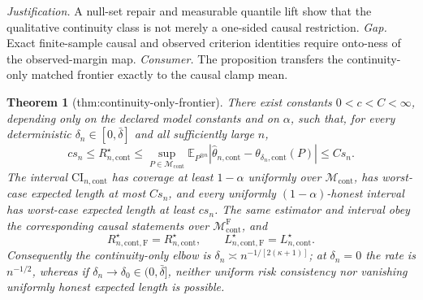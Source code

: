\documentclass{article}
\newtheorem{theorem}{Theorem}
\begin{document}
\par\smallskip\noindent \textit{Justification.} A null-set repair and measurable quantile lift show that the qualitative continuity class is not merely a one-sided causal restriction. \textit{Gap.} Exact finite-sample causal and observed criterion identities require onto-ness of the observed-margin map. \textit{Consumer.} The proposition transfers the continuity-only matched frontier exactly to the causal clamp mean.

\begin{theorem}[thm:continuity-only-frontier]\label{thm:continuity-only-frontier}
There exist constants \(0<c<C<\infty\), depending only on the declared model constants and on \(\alpha\), such that, for every deterministic \(\delta_n\in[0,\bar\delta]\) and all sufficiently large \(n\),
\[
 c s_n\leq R_{n,\mathrm{cont}}^\star
 \leq\sup_{P\in\mathcal M_{\mathrm{cont}}}
 \mathbb E_{P^{\otimes n}}|\widehat\theta_{n,\mathrm{cont}}-\theta_{\delta_n,\mathrm{cont}}(P)|
 \leq Cs_n.
\]
The interval \(\mathrm{CI}_{n,\mathrm{cont}}\) has coverage at least \(1-\alpha\) uniformly over \(\mathcal M_{\mathrm{cont}}\), has worst-case expected length at most \(Cs_n\), and every uniformly \((1-\alpha)\)-honest interval has worst-case expected length at least \(cs_n\).  The same estimator and interval obey the corresponding causal statements over \(\mathcal M_{\mathrm{cont}}^{\mathrm F}\), and
\[
 R_{n,\mathrm{cont},\mathrm F}^\star=R_{n,\mathrm{cont}}^\star,
 \qquad
 L_{n,\mathrm{cont},\mathrm F}^\star=L_{n,\mathrm{cont}}^\star.
\]
Consequently the continuity-only elbow is \(\delta_n\asymp n^{-1/[2(\kappa+1)]}\); at \(\delta_n=0\) the rate is \(n^{-1/2}\), whereas if \(\delta_n\to\delta_0\in(0,\bar\delta]\), neither uniform risk consistency nor vanishing uniformly honest expected length is possible.
\end{theorem}
\end{document}
